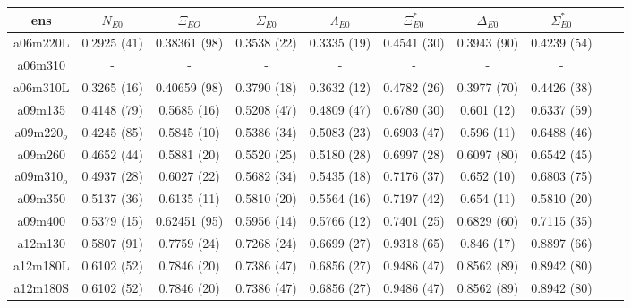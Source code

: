 \begin{table}[h!]
    \centering
   \setlength{\arrayrulewidth}{0.5mm}
  \setlength{\tabcolsep}{13pt}
  \renewcommand{\arraystretch}{2}
   \begin{tabular}{|| c |c | c | c | c | c | c | c | c | c | ||} 
   \hline
   ens & $N_{E0}$ & $\Xi_{EO}$ & $\Sigma_{E0}$ & $\Lambda_{E0}$ &  $\Xi^*_{E0}$ & $\Delta_{E0}$ & $\Sigma^*_{E0}$\\ [0.8ex] 
   \hline\hline
   a06m220L 
   & {0.2925 (41)}   &   { 0.38361 (98)} & {0.3538 (22)}   & { 0.3335 (19)}   & {0.4541 (30)}  & { 0.3943 (90)} & {0.4239 (54)} \\ 
   \hline
   a06m310 
   & {-}   &   {-} & {-}   & {-}   & {-}  & {-} & {-} \\ 
   \hline
   a06m310L 
    & {0.3265 (16)}   &   {0.40659 (98)} & {0.3790 (18)}   & {0.3632 (12)}   & {0.4782 (26)}  & {0.3977 (70)} & {0.4426 (38)} \\ 
   \hline
   a09m135 
    & {0.4148 (79)}   &   {0.5685 (16)} & {0.5208 (47)}   & {0.4809 (47)}   & {0.6780 (30)}  & { 0.601 (12)} & {0.6337 (59)} \\ 
   \hline
   a09m220$_o$ 
   & {0.4245 (85)}   &   {0.5845 (10)} & {0.5386 (34)}   & {0.5083 (23)}   & {0.6903 (47)}  & {0.596 (11)} & {0.6488 (46)} \\ 
   \hline
   a09m260
    & {0.4652 (44)}   &   {0.5881 (20)} & {0.5520 (25)}   & {0.5180 (28)}   & {0.6997 (28)}  & { 0.6097 (80)} & { 0.6542 (45)} \\ 
   \hline
   a09m310$_o$
    & { 0.4937 (28)}   &   {0.6027 (22)} & { 0.5682 (34)}   & {0.5435 (18)}   & {0.7176 (37)}  & {0.652 (10)} & {0.6803 (75)} \\ 
   \hline
   a09m350 
    & {0.5137 (36)}   &   {0.6135 (11)} & {0.5810 (20)}   & {0.5564 (16)}   & {0.7197 (42)}  & {0.654 (11)} & {0.5810 (20)} \\ 
   \hline
   a09m400 
    & { 0.5379 (15)}   &   {0.62451 (95)} & { 0.5956 (14)}   & { 0.5766 (12)}   & {0.7401 (25)}  & { 0.6829 (60)} & { 0.7115 (35)} \\ 
   \hline
   a12m130 
    & {0.5807 (91)}   &   {0.7759 (24)} & { 0.7268 (24)}   & {0.6699 (27)}   & { 0.9318 (65)}  & {0.846 (17)} & {0.8897 (66)} \\ 
   \hline
    a12m180L 
    & {0.6102 (52)}   &   {0.7846 (20)} & {0.7386 (47)}   & {0.6856 (27)}   & {0.9486 (47)}  & { 0.8562 (89)} & {0.8942 (80)} \\ 
   \hline
    a12m180S 
    & {0.6102 (52)}   &   {0.7846 (20)} & {0.7386 (47)}   & {0.6856 (27)}   & {0.9486 (47)}  & {0.8562 (89)} & {0.8942 (80)} \\ 

\end{tabular}
\end{table}
